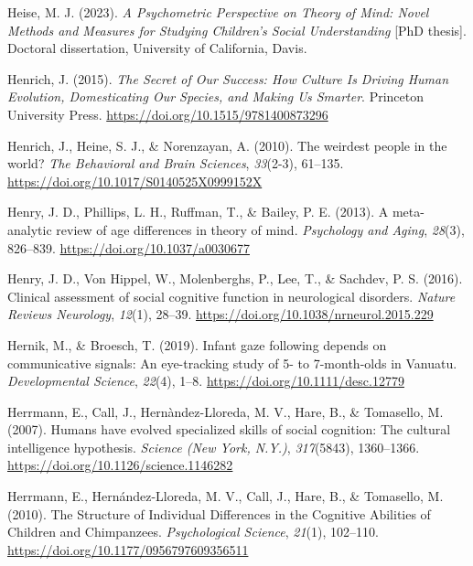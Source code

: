 \documentclass[
]{scrbook}
\newlength{\cslhangindent}
\newenvironment{CSLReferences}[2] %
 {\begin{list}{}{%
  \setlength{\itemindent}{0pt}
  \setlength{\leftmargin}{0pt}
  \setlength{\parsep}{0pt}
  \ifodd #1
   \setlength{\leftmargin}{\cslhangindent}
   \setlength{\itemindent}{-1\cslhangindent}
  \fi
  \setlength{\itemsep}{#2\baselineskip}}}
 {\end{list}}
\begin{document}
\begin{CSLReferences}{1}{0}
Heise, M. J. (2023). \emph{A {Psychometric Perspective} on {Theory} of {Mind}: {Novel Methods} and {Measures} for {Studying Children}'s {Social Understanding}} {[}PhD thesis{]}. Doctoral dissertation, University of California, Davis.

Henrich, J. (2015). \emph{The {Secret} of {Our Success}: {How Culture Is Driving Human Evolution}, {Domesticating Our Species}, and {Making Us Smarter}}. Princeton University Press. \url{https://doi.org/10.1515/9781400873296}

Henrich, J., Heine, S. J., \& Norenzayan, A. (2010). The weirdest people in the world? \emph{The Behavioral and Brain Sciences}, \emph{33}(2-3), 61--135. \url{https://doi.org/10.1017/S0140525X0999152X}

Henry, J. D., Phillips, L. H., Ruffman, T., \& Bailey, P. E. (2013). A meta-analytic review of age differences in theory of mind. \emph{Psychology and Aging}, \emph{28}(3), 826--839. \url{https://doi.org/10.1037/a0030677}

Henry, J. D., Von Hippel, W., Molenberghs, P., Lee, T., \& Sachdev, P. S. (2016). Clinical assessment of social cognitive function in neurological disorders. \emph{Nature Reviews Neurology}, \emph{12}(1), 28--39. \url{https://doi.org/10.1038/nrneurol.2015.229}

Hernik, M., \& Broesch, T. (2019). Infant gaze following depends on communicative signals: {An} eye-tracking study of 5- to 7-month-olds in {Vanuatu}. \emph{Developmental Science}, \emph{22}(4), 1--8. \url{https://doi.org/10.1111/desc.12779}

Herrmann, E., Call, J., Hernàndez-Lloreda, M. V., Hare, B., \& Tomasello, M. (2007). Humans have evolved specialized skills of social cognition: The cultural intelligence hypothesis. \emph{Science (New York, N.Y.)}, \emph{317}(5843), 1360--1366. \url{https://doi.org/10.1126/science.1146282}

Herrmann, E., Hernández-Lloreda, M. V., Call, J., Hare, B., \& Tomasello, M. (2010). The {Structure} of {Individual Differences} in the {Cognitive Abilities} of {Children} and {Chimpanzees}. \emph{Psychological Science}, \emph{21}(1), 102--110. \url{https://doi.org/10.1177/0956797609356511}


\end{CSLReferences}
\end{document}
